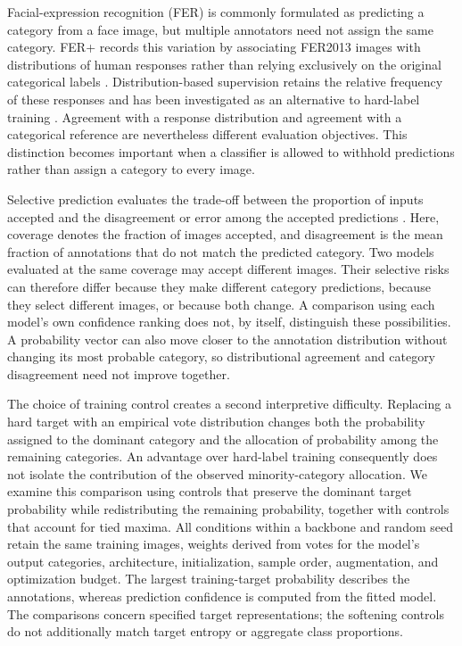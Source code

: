 Facial-expression recognition (FER) is commonly formulated as predicting a category from a face image, but multiple annotators need not assign the same category. FER+ records this variation by associating FER2013 images with distributions of human responses rather than relying exclusively on the original categorical labels \cite{goodfellow2013fer,barsoum2016ferplus}. Distribution-based supervision retains the relative frequency of these responses and has been investigated as an alternative to hard-label training \cite{barsoum2016ferplus,washington2021crowdsourcing}. Agreement with a response distribution and agreement with a categorical reference are nevertheless different evaluation objectives. This distinction becomes important when a classifier is allowed to withhold predictions rather than assign a category to every image.

Selective prediction evaluates the trade-off between the proportion of inputs accepted and the disagreement or error among the accepted predictions \cite{geifman2017selective,geifman2019selectivenet}. Here, coverage denotes the fraction of images accepted, and disagreement is the mean fraction of annotations that do not match the predicted category. Two models evaluated at the same coverage may accept different images. Their selective risks can therefore differ because they make different category predictions, because they select different images, or because both change. A comparison using each model's own confidence ranking does not, by itself, distinguish these possibilities. A probability vector can also move closer to the annotation distribution without changing its most probable category, so distributional agreement and category disagreement need not improve together.

The choice of training control creates a second interpretive difficulty. Replacing a hard target with an empirical vote distribution changes both the probability assigned to the dominant category and the allocation of probability among the remaining categories. An advantage over hard-label training consequently does not isolate the contribution of the observed minority-category allocation. We examine this comparison using controls that preserve the dominant target probability while redistributing the remaining probability, together with controls that account for tied maxima. All conditions within a backbone and random seed retain the same training images, weights derived from votes for the model's output categories, architecture, initialization, sample order, augmentation, and optimization budget. The largest training-target probability describes the annotations, whereas prediction confidence is computed from the fitted model. The comparisons concern specified target representations; the softening controls do not additionally match target entropy or aggregate class proportions.

